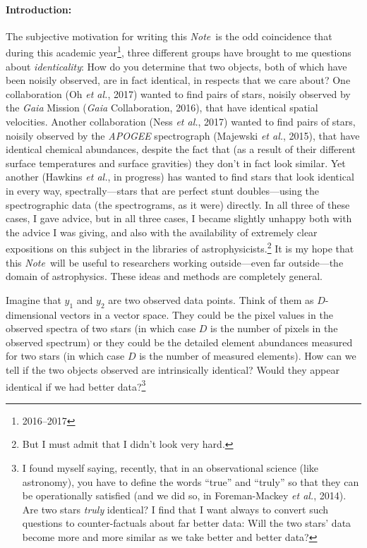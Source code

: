 \documentclass[12pt,letterpaper]{article}
\newcommand{\foreign}[1]{\textsl{#1}}
\newcommand{\project}[1]{\textsl{#1}}
\newcommand{\acronym}[1]{{\small{#1}}}
\newcommand{\documentname}{\textsl{Note}}
\newcommand{\etal}{\foreign{et al.}}
\begin{document}
\paragraph{Introduction:}
The subjective motivation for writing this \documentname\ is the odd coincidence
that during this academic year\footnote{2016--2017}, three different groups
have brought to me questions about \emph{identicality}: How do you
determine that two objects, both of which have been noisily observed,
are in fact identical, in respects that we care about? One collaboration
(Oh \etal, 2017)
wanted to find pairs of stars, noisily observed by
the \project{Gaia} Mission (\project{Gaia} Collaboration, 2016), that have identical spatial
velocities.
Another collaboration (Ness \etal, 2017) wanted to find pairs
of stars, noisily observed by the \project{\acronym{APOGEE}}
spectrograph (Majewski \etal, 2015), that have identical chemical abundances, despite the fact
that (as a result of their different surface temperatures and surface
gravities) they don't in fact look similar.
Yet another (Hawkins \etal, in progress) has wanted to find stars that
look identical in every way, spectrally---stars that are perfect stunt
doubles---using the spectrographic data (the spectrograms, as it were)
directly. In all three of these cases, I gave advice, but in all three
cases, I became slightly unhappy both with the advice I was giving, and
also with the availability of extremely clear expositions on this subject
in the libraries of astrophysicists.\footnote{But I must admit that I didn't
  look very hard.}
It is my hope that this \documentname\ will be useful to researchers working
outside---even far outside---the domain of astrophysics. These ideas and methods 
are completely general.

Imagine that $y_1$ and $y_2$ are two observed data points. Think of
them as $D$-dimensional vectors in a vector space. They could be the
pixel values in the observed spectra of two stars (in which case $D$
is the number of pixels in the observed spectrum) or they could be
the detailed element abundances measured for two stars (in which case
$D$ is the number of measured elements). How can we tell if the two
objects observed are intrinsically identical? Would they appear
identical if we had better data?\footnote{I found myself saying,
  recently, that in an observational science (like astronomy), you
  have to define the words ``true'' and ``truly'' so that they can be
  operationally satisfied (and we did so, in Foreman-Mackey \etal, 2014).
  Are two stars \emph{truly} identical?  I
  find that I want always to convert such questions to
  counter-factuals about far better data: Will the two stars' data
  become more and more similar as we take better and better data?}
\end{document}
